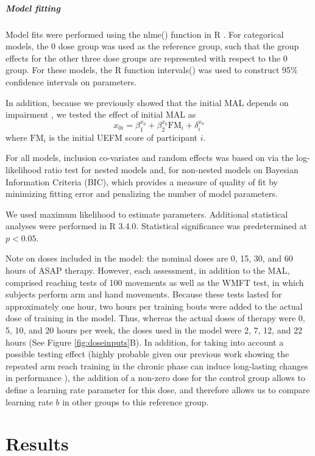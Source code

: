 \subparagraph{Model fitting}
Model fits were performed using the \textsf{nlme()} function in \textsf{R} \cite{Pinheiro2015}.
For categorical models, the 0 dose group was used as the reference group, such that the group effects for the other three dose groups are represented with respect to the 0 group. 
For these models, the \textsf{R} function \textsf{intervals()} was used to construct 95\% confidence intervals on parameters.

In addition, because we previously showed that the initial MAL depends on impairment \cite{Winstein2015}, we tested the effect of initial MAL as 
\begin{equation}
	x_{0i} = \beta_1^{x_0} + \beta_2^{x_0} \text{FM}_i + \delta_i^{x_0}
\end{equation}
where $ \text{FM}_i $ is the initial UEFM score of participant $ i $.

For all models, inclusion co-variates and random effects was based on via the log-likelihood ratio test for nested models and, for non-nested models on Bayesian Information Criteria (BIC), which provides a measure of quality of fit by minimizing fitting error and penalizing the number of model parameters. 

We used maximum likelihood to estimate parameters. 
Additional statistical analyses were performed in \textsf{R 3.4.0}. 
Statistical significance was predetermined at $ p < 0.05 $. 

Note on doses included in the model: the nominal doses are 0, 15, 30, and 60 hours of ASAP therapy. 
However, each assessment, in addition to the MAL, comprised reaching tests of 100 movements as well as the WMFT test, in which subjects perform arm and hand movements. 
Because these tests lasted for approximately one hour, two hours per training bouts were added to the actual dose of training in the model.
Thus, whereas the actual doses of therapy were 0, 5, 10, and 20 hours per week, the doses used in the model were 2, 7, 12, and 22 hours (See Figure \ref{fig:doseinputs}B). 
In addition, for taking into account a possible testing effect (highly probable given our previous work showing the repeated arm reach training in the chronic phase can induce long-lasting changes in performance \cite{Park2016}), the addition of a non-zero dose for the control group allows to define a learning rate parameter for this dose, and therefore allows us to compare learning rate $ b $ in other groups to this reference group.


\section{Results}

